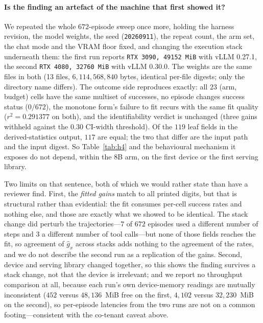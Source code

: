 \documentclass[10pt]{article} %
\begin{document}
\paragraph{Is the finding an artefact of the machine that first showed it?}
We repeated the whole $672$-episode sweep once more, holding the harness revision, the
model weights, the seed (\texttt{20260911}), the repeat count, the arm set, the chat mode
and the VRAM floor fixed, and changing the execution stack underneath them: the first run
reports \texttt{RTX 3090, 49152~MiB} with vLLM 0.27.1, the second
\texttt{RTX 4080, 32760~MiB} with vLLM 0.30.0. The weights are the same files in both
(13 files, $6{,}114{,}568{,}840$ bytes, identical per-file digests; only the directory
name differs). The outcome side reproduces exactly: all $23$ (arm, budget) cells have the
same multiset of successes, no episode changes success status ($0/672$), the monotone form's
failure to fit recurs with the same fit quality ($r^2{=}0.291377$ on both), and the
identifiability verdict is unchanged (three gains withheld against the $0.30$ CI-width
threshold). Of the $119$ leaf fields in the derived-statistics output, $117$ are equal;
the two that differ are the input path and the input digest. So Table~\ref{tab:h4} and the
behavioural mechanism it exposes do not depend, within the $8$B arm, on the first device or
the first serving
library.

Two limits on that sentence, both of which we would rather state than have a reviewer
find. First, the \emph{fitted gains} match to all printed digits, but that is structural
rather than evidential: the fit consumes per-cell success rates and nothing else, and
those are exactly what we showed to be identical. The stack change did perturb the
trajectories---$7$ of $672$ episodes used a different number of steps and $3$ a different
number of tool calls---but none of those fields reaches the fit, so agreement of
$\hat{g}_x$ across stacks adds nothing to the agreement of the rates, and we do not
describe the second run as a replication of the gains. Second, device and serving library
changed together, so this shows the finding survives a stack change, not that the device
is irrelevant; and we report no throughput comparison at all, because each run's own
device-memory readings are mutually inconsistent ($452$ versus $48{,}136$~MiB free on the
first, $4{,}102$ versus $32{,}230$~MiB on the second), so per-episode latencies from the
two runs are not on a common footing---consistent with the co-tenant caveat above.
\end{document}
